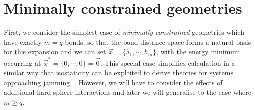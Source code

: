 \documentclass[11pt,twoside]{report}
\begin{document}


\section{Minimally constrained geometries}
\label{sec:no-ep-integration}

First, we consider the simplest case of \emph{minimally constrained} geometries which have exactly $m=q$ bonds, so that the bond-distance space forms a natural basis for this expansion and we can set $\vec{x} = \{h_1, \cdots, h_m\}$, with the energy minimum occurring at $\vec{x}^* = \{0, \cdots, 0\} = \vec{0}$.
This special case simplifies calculation in a similar way that isostaticity can be exploited to derive theories for systems approaching jamming, \cite{WyartAP2005,BritoEEL2006}.
However, we will have to consider the effects of additional hard sphere interactions and later we will generalise to the case where $m \ge q$.
\end{document}
